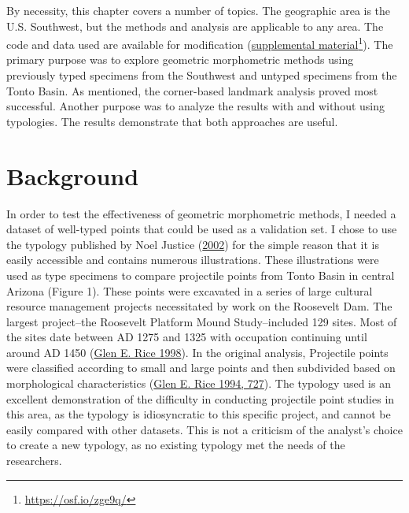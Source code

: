 \documentclass{article}
\begin{document}
By necessity, this chapter covers a number of topics. The geographic
area is the U.S. Southwest, but the methods and analysis are applicable
to any area. The code and data used are available for modification
(\href{https://osf.io/zge9q/}{supplemental material}\footnote{\url{https://osf.io/zge9q/}}).
The primary purpose was to explore geometric morphometric methods using
previously typed specimens from the Southwest and untyped specimens from
the Tonto Basin. As mentioned, the corner-based landmark analysis proved
most successful. Another purpose was to analyze the results with and
without using typologies. The results demonstrate that both approaches
are useful.

\hypertarget{background}{%
\section{Background}\label{background}}

In order to test the effectiveness of geometric morphometric methods, I
needed a dataset of well-typed points that could be used as a validation
set. I chose to use the typology published by Noel Justice
(\protect\hyperlink{ref-Justice2002-cf}{2002}) for the simple reason
that it is easily accessible and contains numerous illustrations. These
illustrations were used as type specimens to compare projectile points
from Tonto Basin in central Arizona (Figure 1). These points were
excavated in a series of large cultural resource management projects
necessitated by work on the Roosevelt Dam. The largest project--the
Roosevelt Platform Mound Study--included 129 sites. Most of the sites
date between AD 1275 and 1325 with occupation continuing until around AD
1450 (\protect\hyperlink{ref-Rice1998-ku}{Glen E. Rice 1998}). In the
original analysis, Projectile points were classified according to small
and large points and then subdivided based on morphological
characteristics (\protect\hyperlink{ref-Rice1994-rk}{Glen E. Rice 1994,
727}). The typology used is an excellent demonstration of the difficulty
in conducting projectile point studies in this area, as the typology is
idiosyncratic to this specific project, and cannot be easily compared
with other datasets. This is not a criticism of the analyst's choice to
create a new typology, as no existing typology met the needs of the
researchers.
\end{document}
